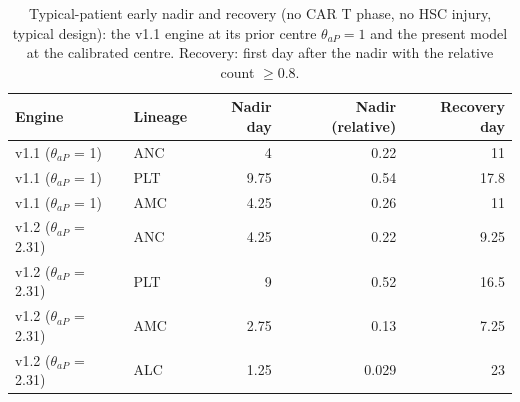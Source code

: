 \begin{table}[!htbp]
\centering
\small
\setlength{\tabcolsep}{3.5pt}
\caption{Typical-patient early nadir and recovery (no CAR T phase, no HSC injury, typical design): the v1.1 engine at its prior centre $\theta_{aP}=1$ and the present model at the calibrated centre. Recovery: first day after the nadir with the relative count $\geq 0.8$.}
\label{tab:v11}
\begin{tabular}{llrrr}
\toprule
Engine & Lineage & Nadir day & Nadir (relative) & Recovery day \\
\midrule
v1.1 ($\theta_{aP}$ = 1) & ANC & 4 & 0.22 & 11 \\
v1.1 ($\theta_{aP}$ = 1) & PLT & 9.75 & 0.54 & 17.8 \\
v1.1 ($\theta_{aP}$ = 1) & AMC & 4.25 & 0.26 & 11 \\
v1.2 ($\theta_{aP}$ = 2.31) & ANC & 4.25 & 0.22 & 9.25 \\
v1.2 ($\theta_{aP}$ = 2.31) & PLT & 9 & 0.52 & 16.5 \\
v1.2 ($\theta_{aP}$ = 2.31) & AMC & 2.75 & 0.13 & 7.25 \\
v1.2 ($\theta_{aP}$ = 2.31) & ALC & 1.25 & 0.029 & 23 \\
\bottomrule
\end{tabular}
\end{table}
